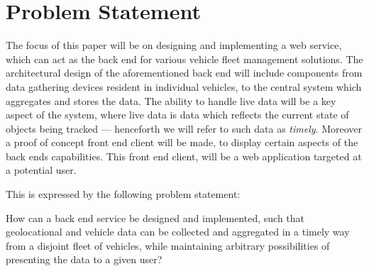 \section{Problem Statement}\label{sec:problem_statement}

The focus of this paper will be on designing and implementing a web service,
which can act as the back end for various vehicle fleet management solutions.
The architectural design of the aforementioned back end will include components
from data gathering devices resident in individual vehicles,
to the central system which aggregates and stores the data.
The ability to handle live data will be a key aspect of the system,
where live data is data which reflects the current state of objects being tracked
--- henceforth we will refer to such data as \textit{timely}.
Moreover a proof of concept front end client will be made,
to display certain aspects of the back ends capabilities.
This front end client, will be a web application targeted at a potential user.

This is expressed by the following problem statement:

\medskip
{\addtolength{\leftskip}{10mm}\addtolength{\rightskip}{10mm}\noindent\hrulefill\it

\noindent How can a back end service be designed and implemented,
such that geolocational and vehicle data can be collected and aggregated in a timely way from a disjoint fleet of vehicles,
while maintaining arbitrary possibilities of presenting the data to a given user?

\noindent\hrulefill

}
